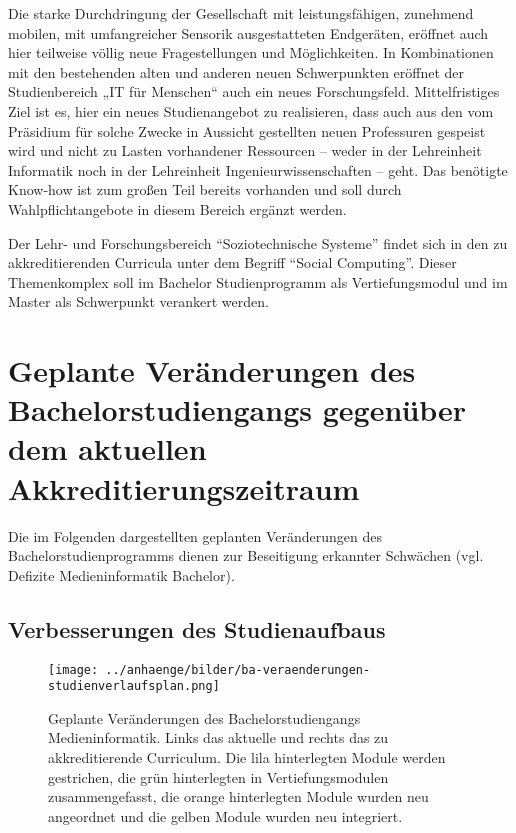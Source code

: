 \begin{siderules}
Die starke Durchdringung der Gesellschaft mit leistungsfähigen,
zunehmend mobilen, mit umfangreicher Sensorik ausgestatteten Endgeräten,
eröffnet auch hier teilweise völlig neue Fragestellungen und
Möglichkeiten. In Kombinationen mit den bestehenden alten und anderen
neuen Schwerpunkten eröffnet der Studienbereich „IT für Menschen`` auch
ein neues Forschungsfeld. Mittelfristiges Ziel ist es, hier ein neues
Studienangebot zu realisieren, dass auch aus den vom Präsidium für
solche Zwecke in Aussicht gestellten neuen Professuren gespeist wird und
nicht zu Lasten vorhandener Ressourcen -- weder in der Lehreinheit
Informatik noch in der Lehreinheit Ingenieurwissenschaften -- geht. Das
benötigte Know-how ist zum großen Teil bereits vorhanden und soll durch
Wahlpflichtangebote in diesem Bereich ergänzt werden.
\end{siderules}

Der Lehr- und Forschungsbereich ``Soziotechnische Systeme'' findet sich
in den zu akkreditierenden Curricula unter dem Begriff ``Social
Computing''. Dieser Themenkomplex soll im Bachelor Studienprogramm als
Vertiefungsmodul und im Master als Schwerpunkt verankert werden.

\section{Geplante Veränderungen des Bachelorstudiengangs gegenüber
dem aktuellen
Akkreditierungszeitraum\label{/mi-2017/selbstbericht/0150-soll-zustand-geplante-veraenderungen/0000-geplante-veraenderungen-bachelor}}\label{geplante-veruxe4nderungen-des-bachelorstudiengangs-gegenuxfcber-dem-aktuellen-akkreditierungszeitraumpathlabelmi-2017selbstbericht0150-soll-zustand-geplante-veraenderungen0000-geplante-veraenderungen-bachelor}

Die im Folgenden dargestellten geplanten Veränderungen des
Bachelorstudienprogramms dienen zur Beseitigung erkannter Schwächen
(vgl. Defizite Medieninformatik Bachelor).

\subsection{Verbesserungen des
Studienaufbaus\label{/mi-2017/selbstbericht/0150-soll-zustand-geplante-veraenderungen/0000-geplante-veraenderungen-bachelor}}\label{verbesserungen-des-studienaufbauspathlabelmi-2017selbstbericht0150-soll-zustand-geplante-veraenderungen0000-geplante-veraenderungen-bachelor}

\begin{figure}[htbp]
\centering
\texttt{[image: ../anhaenge/bilder/ba-veraenderungen-studienverlaufsplan.png]}
\caption{Geplante Veränderungen des Bachelorstudiengangs
Medieninformatik. Links das aktuelle und rechts das zu akkreditierende
Curriculum. Die lila hinterlegten Module werden gestrichen, die grün
hinterlegten in Vertiefungsmodulen zusammengefasst, die orange
hinterlegten Module wurden neu angeordnet und die gelben Module wurden
neu integriert.}
\end{figure}

